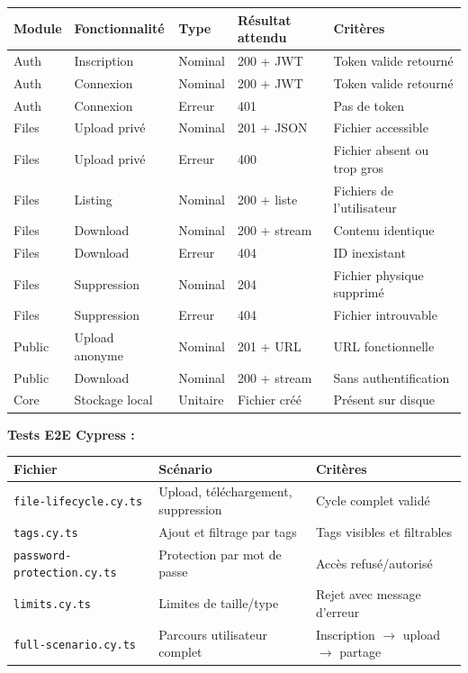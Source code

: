 \documentclass[12pt,a4paper]{article}
\begin{document}
\begin{longtable}{p{1.5cm} p{3cm} p{2.5cm} p{3cm} p{3.5cm}}
\toprule
\textbf{Module} & \textbf{Fonctionnalit\'e} & \textbf{Type} & \textbf{R\'esultat attendu} & \textbf{Crit\`eres} \\
\midrule
\endhead
Auth & Inscription & Nominal & 200 + JWT & Token valide retourn\'e \\
Auth & Connexion & Nominal & 200 + JWT & Token valide retourn\'e \\
Auth & Connexion & Erreur & 401 & Pas de token \\
Files & Upload priv\'e & Nominal & 201 + JSON & Fichier accessible \\
Files & Upload priv\'e & Erreur & 400 & Fichier absent ou trop gros \\
Files & Listing & Nominal & 200 + liste & Fichiers de l'utilisateur \\
Files & Download & Nominal & 200 + stream & Contenu identique \\
Files & Download & Erreur & 404 & ID inexistant \\
Files & Suppression & Nominal & 204 & Fichier physique supprim\'e \\
Files & Suppression & Erreur & 404 & Fichier introuvable \\
Public & Upload anonyme & Nominal & 201 + URL & URL fonctionnelle \\
Public & Download & Nominal & 200 + stream & Sans authentification \\
Core & Stockage local & Unitaire & Fichier cr\'e\'e & Pr\'esent sur disque \\
\bottomrule
\end{longtable}

\textbf{Tests E2E Cypress :}

\begin{longtable}{p{4.5cm} p{5cm} p{5cm}}
\toprule
\textbf{Fichier} & \textbf{Sc\'enario} & \textbf{Crit\`eres} \\
\midrule
\endhead
\texttt{file-lifecycle.cy.ts} & Upload, t\'el\'echargement, suppression & Cycle complet valid\'e \\
\texttt{tags.cy.ts} & Ajout et filtrage par tags & Tags visibles et filtrables \\
\texttt{password-protection.cy.ts} & Protection par mot de passe & Acc\`es refus\'e/autoris\'e \\
\texttt{limits.cy.ts} & Limites de taille/type & Rejet avec message d'erreur \\
\texttt{full-scenario.cy.ts} & Parcours utilisateur complet & Inscription $\rightarrow$ upload $\rightarrow$ partage \\
\bottomrule
\end{longtable}
\end{document}
